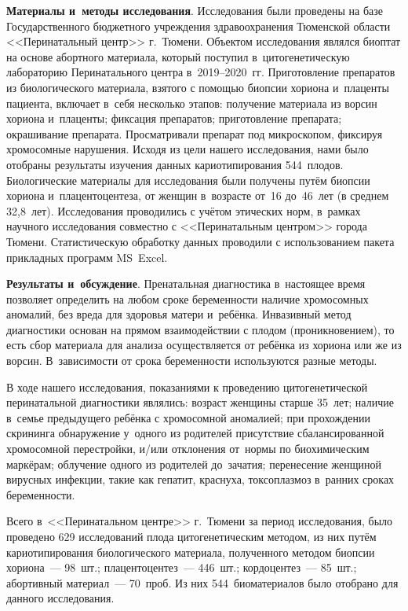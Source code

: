 \textbf{Материалы и~методы исследования}. Исследования были проведены на базе Государственного бюджетного учреждения здравоохранения Тюменской области <<Перинатальный центр>> г.~Тюмени. Объектом исследования являлся биоптат на основе абортного материала, который поступил в~цитогенетическую лабораторию Перинатального центра в~2019--2020~гг. Приготовление препаратов из биологического материала, взятого с помощью биопсии хориона и~плаценты пациента, включает в~себя несколько этапов: получение материала из ворсин хориона и~плаценты; фиксация препаратов; приготовление препарата; окрашивание препарата. Просматривали препарат под микроскопом, фиксируя хромосомные нарушения. Исходя из цели нашего исследования, нами было отобраны результаты изучения данных кариотипирования 544~плодов. Биологические материалы для исследования были получены путём биопсии хориона и~плацентоцентеза, от женщин в~возрасте от~16 до~46~лет (в среднем 32,8~лет).  Исследования проводились с учётом этических норм, в~рамках научного исследования совместно с <<Перинатальным центром>> города Тюмени. Статистическую обработку данных проводили с использованием пакета прикладных программ MS~Excel.

\textbf{Результаты и~обсуждение}. Пренатальная диагностика в~настоящее время позволяет определить на любом сроке беременности наличие хромосомных аномалий, без вреда для здоровья матери и~ребёнка. Инвазивный метод диагностики основан на прямом взаимодействии с плодом (проникновением), то есть сбор материала для анализа осуществляется от ребёнка из хориона или же из ворсин. В~зависимости от срока беременности используются разные методы.

В ходе нашего исследования, показаниями к проведению цитогенетической перинатальной диагностики являлись: возраст женщины старше 35~лет; наличие в~семье предыдущего ребёнка с хромосомной аномалией; при прохождении скрининга обнаружение у~одного из родителей присутствие сбалансированной хромосомной перестройки, и/или отклонения от~нормы по биохимическим маркёрам; облучение одного из родителей до~зачатия; перенесение женщиной вирусных инфекции, такие как гепатит, краснуха, токсоплазмоз в~ранних сроках беременности.

Всего в~<<Перинатальном центре>> г.~Тюмени за период исследования, было проведено 629 исследований плода цитогенетическим методом, из них путём кариотипирования биологического материала, полученного методом биопсии хориона~--- 98~шт.; плацентоцентез~--- 446~шт.; кордоцентез~--- 85~шт.; абортивный материал~--- 70~проб. Из них 544~биоматериалов было отобрано для данного исследования.

